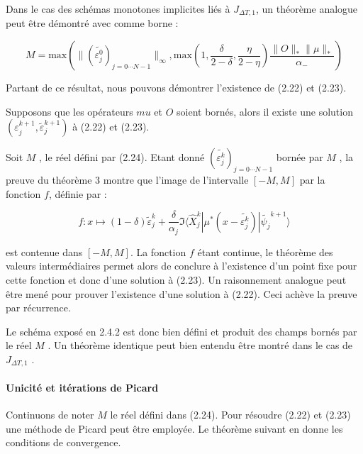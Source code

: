Dans le cas des schémas monotones implicites liés à $J_{\Delta T,1}$, un théorème analogue peut être démontré avec comme borne :

$$  M = \text{max}(\lVert (\tilde{\varepsilon^0_j})_{j=0\cdots N-1}\lVert_{\infty}, \text{max}(1,\frac{\delta}{2-\delta}, \frac{\eta}{2-\eta})\frac{\lVert O \rVert_* \lVert \mu \rVert_* }{\alpha_-} ) $$

Partant de ce résultat, nous pouvons démontrer l’existence de (2.22) et (2.23).

\begin{theorem}
	Supposons que les opérateurs $mu$ et $O$ soient bornés, alors il existe une solution $ ( \varepsilon_j^{k+1}, \tilde{\varepsilon}_j^{k+1} ) $ à (2.22) et (2.23).
\end{theorem}

\begin{ proof }
	
	Soit $M$ , le réel défini par (2.24). Etant donné 
	$(\tilde{\varepsilon^k_j})_{j=0\cdots N-1}$ bornée par $M$ , la preuve du théorème 3 montre que l’image de l'intervalle $[-M, M ]$ par la fonction $f$, définie par :
	
	\begin{equation}
	f: x \mapsto (1-\delta)\tilde{\varepsilon}_j^k + \frac{\delta}{\alpha_j} \Im \langle \hat{X}^k_j| \mu^* (x - \tilde{\varepsilon^k_j})| \tilde{\psi_j}^{k+1} \rangle
	\end{equation}
	
	est contenue dans $[-M, M ]$. La fonction $f$ étant continue, le théorème des valeurs intermédiaires permet alors de conclure à l'existence d’un point fixe pour cette fonction et donc d’une solution à (2.23). Un raisonnement analogue peut être mené pour prouver l'existence d’une solution à (2.22). Ceci achève la preuve par récurrence.
	
\end{ proof }

Le schéma exposé en 2.4.2 est donc bien défini et produit des champs bornés par le réel $M$ . Un théorème identique peut bien entendu être montré dans le cas de $ J_{\Delta T,1} $ .

\paragraph*{Unicité et itérations de Picard}
$ $\\Continuons de noter $M$ le réel défini dans (2.24). Pour résoudre (2.22) et (2.23) une méthode de Picard peut être employée. Le théorème suivant en donne les conditions de convergence.

